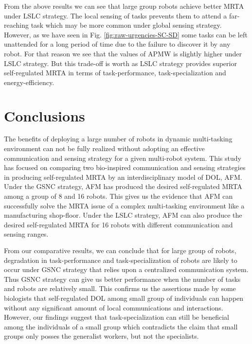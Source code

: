 \documentclass[final,5p,times,twocolumn]{elsarticle}
\begin{document}
From the above results we can see that large group robots achieve better MRTA under LSLC strategy. The local sensing of tasks prevents them to attend a far-reaching task which may be more common under global sensing strategy. However, as we have seen in Fig. \ref{fig:raw-urgencies-SC-SD}
some tasks can be left unattended for a long period of time due to the failure to discover it by any robot. For that reason we see that the values of APMW is slightly higher under LSLC strategy. But this trade-off is worth as LSLC strategy provides superior self-regulated MRTA in terms of task-performance, task-specialization and energy-efficiency. 
\section{Conclusions}
\label{sec:conc}
The benefits of deploying a large number of robots in dynamic multi-tasking environment can not be fully realized without adopting an effective communication and sensing strategy for a given multi-robot system. This study has focused on comparing two bio-inspired  communication and sensing strategies in producing self-regulated MRTA by an interdisciplinary model of DOL, AFM. Under the GSNC strategy, AFM has produced the desired self-regulated MRTA among a group of 8 and 16 robots. This gives us the evidence that AFM can successfully solve the MRTA issue of a complex multi-tasking environment like a manufacturing shop-floor. Under the LSLC strategy, AFM can also produce the desired self-regulated MRTA for 16 robots with different communication and sensing ranges.

From our comparative results, we can conclude that for large group of robots,  degradation in  task-performance and task-specialization of robots are likely to occur  under GSNC strategy that relies upon a centralized communication system. Thus GSNC strategy can give us better performance when the number of tasks and robots are relatively small. This confirms us the assertions made by some biologists that self-regulated DOL among small group of individuals can happen without any significant amount of local communications and interactions. However, our findings suggest that task-specialization can still be beneficial among the individuals of a small group which contradicts the claim that small groups only posses the generalist workers, but not the specialists.
\end{document}
